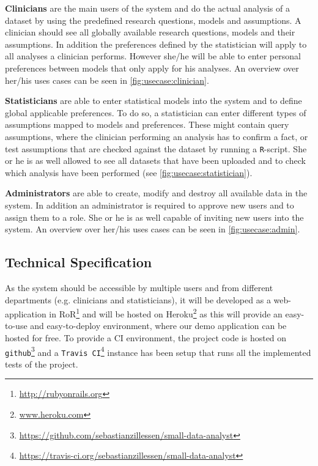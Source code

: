 \textbf{Clinicians} are the main users of the system and do the actual analysis of a dataset by using the predefined research questions, models and assumptions. A clinician should see all globally available research questions, models and their assumptions. In addition the preferences defined by the statistician will apply to all analyses a clinician performs. However she/he will be able to enter personal preferences between models that only apply for his analyses. An overview over her/his uses cases can be seen in \autoref{fig:usecase:clinician}.

\textbf{Statisticians} are able to enter statistical models into the system and to define global applicable preferences. To do so, a statistician can enter different types of assumptions mapped to models and preferences. These might contain query assumptions, where the clinician performing an analysis has to confirm a fact, or test assumptions that are checked against the dataset by running a \texttt{R}-script. She or he is as well allowed to see all datasets that have been uploaded and to check which analysis have been performed (see \autoref{fig:usecase:statistician}).



\textbf{Administrators} are able to create, modify and destroy all available data in the system. In addition an administrator is required to approve new users and to assign them to a role. She or he is as well capable of inviting new users into the system. An overview over her/his uses cases can be seen in \autoref{fig:usecase:admin}.



\subsection{Technical Specification}
\label{sub:technical}

As the system should be accessible by multiple users and from different departments (e.g. clinicians and statisticians), it will be developed as a web-application in \gls{RoR}\footnote{\href{http://rubyonrails.org}{http://rubyonrails.org}} and will be hosted on Heroku\footnote{\href{https://www.heroku.com}{www.heroku.com}} as this will provide an easy-to-use and easy-to-deploy environment, where our demo application can be hosted for free. To provide a \gls{CI} environment, the project code is hosted on \texttt{github}\footnote{\href{https://github.com/sebastianzillessen/small-data-analyst}{https://github.com/sebastianzillessen/small-data-analyst}} and a \texttt{Travis CI}\footnote{\href{https://travis-ci.org/sebastianzillessen/small-data-analyst}{https://travis-ci.org/sebastianzillessen/small-data-analyst} } instance has been setup that runs all the implemented tests of the project.

